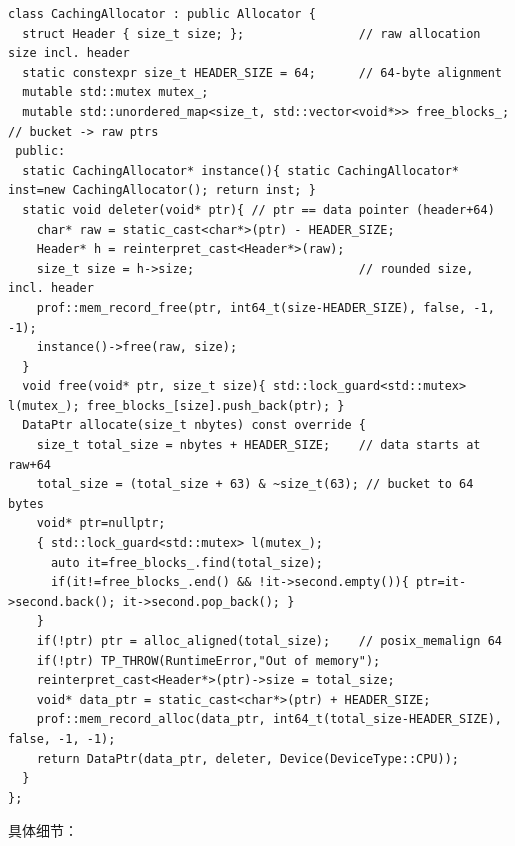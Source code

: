 \begin{lstlisting}[caption={bucketed caching allocator.}, label=lst:cachingalloc]
class CachingAllocator : public Allocator {
  struct Header { size_t size; };                // raw allocation size incl. header
  static constexpr size_t HEADER_SIZE = 64;      // 64-byte alignment
  mutable std::mutex mutex_;
  mutable std::unordered_map<size_t, std::vector<void*>> free_blocks_; // bucket -> raw ptrs
 public:
  static CachingAllocator* instance(){ static CachingAllocator* inst=new CachingAllocator(); return inst; }
  static void deleter(void* ptr){ // ptr == data pointer (header+64)
    char* raw = static_cast<char*>(ptr) - HEADER_SIZE;
    Header* h = reinterpret_cast<Header*>(raw);
    size_t size = h->size;                       // rounded size, incl. header
    prof::mem_record_free(ptr, int64_t(size-HEADER_SIZE), false, -1, -1);
    instance()->free(raw, size);
  }
  void free(void* ptr, size_t size){ std::lock_guard<std::mutex> l(mutex_); free_blocks_[size].push_back(ptr); }
  DataPtr allocate(size_t nbytes) const override {
    size_t total_size = nbytes + HEADER_SIZE;    // data starts at raw+64
    total_size = (total_size + 63) & ~size_t(63); // bucket to 64 bytes
    void* ptr=nullptr;
    { std::lock_guard<std::mutex> l(mutex_);
      auto it=free_blocks_.find(total_size);
      if(it!=free_blocks_.end() && !it->second.empty()){ ptr=it->second.back(); it->second.pop_back(); }
    }
    if(!ptr) ptr = alloc_aligned(total_size);    // posix_memalign 64
    if(!ptr) TP_THROW(RuntimeError,"Out of memory");
    reinterpret_cast<Header*>(ptr)->size = total_size;
    void* data_ptr = static_cast<char*>(ptr) + HEADER_SIZE;
    prof::mem_record_alloc(data_ptr, int64_t(total_size-HEADER_SIZE), false, -1, -1);
    return DataPtr(data_ptr, deleter, Device(DeviceType::CPU));
  }
};
\end{lstlisting}

具体细节：

